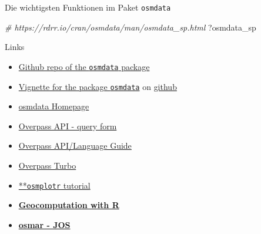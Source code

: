 \documentclass[ignorenonframetext,]{beamer}
\newenvironment{Shaded}{\begin{snugshade}}{\end{snugshade}}
\newcommand{\CommentTok}[1]{\textcolor[rgb]{0.56,0.35,0.01}{\textit{#1}}}
\newcommand{\NormalTok}[1]{#1}
\begin{document}
\begin{frame}[fragile]{Die wichtigsten Funktionen im Paket
\texttt{osmdata}}

\begin{Shaded}
\begin{Highlighting}[]
\CommentTok{# https://rdrr.io/cran/osmdata/man/osmdata_sp.html}
\NormalTok{?osmdata_sp}
\end{Highlighting}
\end{Shaded}

\end{frame}

\begin{frame}[fragile]{Links}

\begin{itemize}
\item
  \href{https://github.com/ropensci/osmdata}{Github repo of the
  \texttt{osmdata} package}
\item
  \href{https://cran.r-project.org/web/packages/osmdata/vignettes/osmdata.html}{Vignette
  for the package \texttt{osmdata}} on
  \href{https://github.com/ropensci/osmdata/blob/master/vignettes/osmdata.Rmd}{github}
\item
  \href{https://ropensci.github.io/osmdata/}{osmdata Homepage}
\item
  \href{http://overpass-api.de/query_form.html}{Overpass API - query
  form}
\item
  \href{https://wiki.openstreetmap.org/wiki/DE:Overpass_API/Language_Guide}{Overpass
  API/Language Guide}
\item
  \href{https://wiki.openstreetmap.org/wiki/DE:Overpass_turbo}{Overpass
  Turbo} 
\item
  \href{https://ropensci.org/tutorials/osmplotr_tutorial/}{**\texttt{osmplotr}
  tutorial}
\item
  \href{https://bookdown.org/robinlovelace/geocompr/}{\textbf{Geocomputation
  with R}}
\item
  \href{https://www.theoj.org/joss-papers/joss.00305/10.21105.joss.00305.pdf}{\textbf{osmar
  - JOS}}
\end{itemize}

\end{frame}
\end{document}
